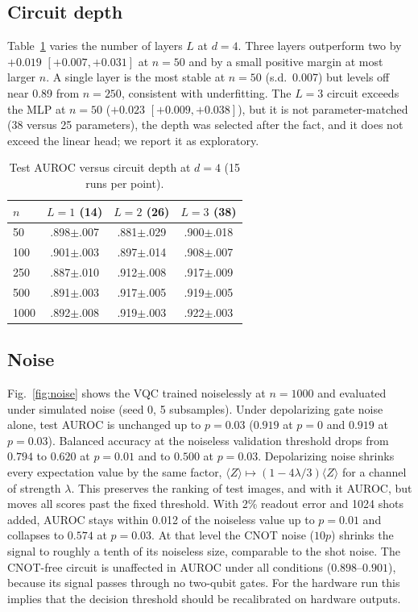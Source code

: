 \documentclass[conference]{IEEEtran}
\begin{document}
\subsection{Circuit depth}
Table~\ref{tab:depth} varies the number of layers $L$ at $d=4$. Three
layers outperform two by $+0.019$ $[+0.007,+0.031]$ at $n=50$ and by a
small positive margin at most larger $n$. A single layer is the most
stable at $n=50$ (s.d.\ 0.007) but levels off near 0.89 from $n=250$,
consistent with underfitting. The $L=3$ circuit exceeds the MLP at $n=50$
($+0.023$ $[+0.009,+0.038]$), but it is not parameter-matched (38 versus
25 parameters), the depth was selected after the fact, and it does not
exceed the linear head; we report it as exploratory.

\begin{table}[t]
\centering
\caption{Test AUROC versus circuit depth at $d=4$ (15 runs per point).}
\label{tab:depth}
\footnotesize
\begin{tabular}{@{}lccc@{}}
\toprule
$n$ & $L=1$ (14) & $L=2$ (26) & $L=3$ (38) \\
\midrule
50   & .898$\pm$.007 & .881$\pm$.029 & .900$\pm$.018 \\
100  & .901$\pm$.003 & .897$\pm$.014 & .908$\pm$.007 \\
250  & .887$\pm$.010 & .912$\pm$.008 & .917$\pm$.009 \\
500  & .891$\pm$.003 & .917$\pm$.005 & .919$\pm$.005 \\
1000 & .892$\pm$.008 & .919$\pm$.003 & .922$\pm$.003 \\
\bottomrule
\end{tabular}
\end{table}

\subsection{Noise}
Fig.~\ref{fig:noise} shows the VQC trained noiselessly at $n=1000$ and
evaluated under simulated noise (seed 0, 5 subsamples). Under depolarizing
gate noise alone, test AUROC is unchanged up to $p=0.03$ ($0.919$ at $p=0$
and $0.919$ at $p=0.03$). Balanced accuracy at the noiseless validation
threshold drops from $0.794$ to $0.620$ at $p=0.01$ and to $0.500$ at
$p=0.03$. Depolarizing noise shrinks every expectation value by the same
factor, $\langle Z\rangle\mapsto(1-4\lambda/3)\langle Z\rangle$ for a
channel of strength $\lambda$. This preserves the ranking of test images,
and with it AUROC, but moves all scores past the fixed threshold. With 2\%
readout error and 1024 shots added, AUROC stays within 0.012 of the
noiseless value up to $p=0.01$ and collapses to $0.574$ at $p=0.03$. At
that level the CNOT noise ($10p$) shrinks the signal to roughly a tenth of
its noiseless size, comparable to the shot noise. The CNOT-free circuit is
unaffected in AUROC under all conditions ($0.898$--$0.901$), because its
signal passes through no two-qubit gates. For the hardware run this
implies that the decision threshold should be recalibrated on hardware
outputs.
\end{document}
